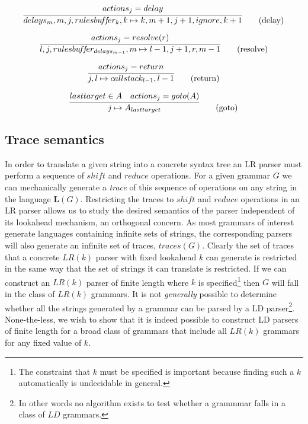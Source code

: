 \documentclass[envcountsame,runningheads]{llncs}
\begin{document}
\begin{equation}
\infer{delays_m, m, j, rulesbu\!f\!f\!er_k, k \mapsto k, m+1, j+1, ignore, k+1}{actions_j = delay} \tag{delay}
\end{equation}

\begin{equation}
\infer{l, j, rulesbu\!f\!f\!er_{delays_{m-1}}, m \mapsto l-1, j+1, r, m-1}{actions_j = resolve(r)} \tag{resolve}
\end{equation}

\begin{equation}
\infer{j, l \mapsto callstack_{l-1}, l-1}{actions_j = return} \tag{return}
\end{equation}

\begin{equation}
\infer{j \mapsto A_{lasttarget}}{lasttarget \in A & actions_j = goto(A)} \tag{goto}
\end{equation}

\subsection{Trace semantics}

In order to translate a given string into a concrete syntax tree an LR parser must perform a sequence of $shi\!ft$ and $reduce$ operations.
For a given grammar $G$ we can mechanically generate a \emph{trace} of this sequence of operations on any string in the language $\boldsymbol{L}(G)$.
Restricting the traces to $shi\!ft$ and $reduce$ operations in an LR parser allows us to study the desired semantics of the parser independent of its lookahead mechanism, an orthogonal concern.
As most grammars of interest generate languages containing infinite sets of strings, the corresponding parsers will also generate an infinite set of traces, $traces(G)$.
Clearly the set of traces that a concrete $LR(k)$ parser with fixed lookahead $k$ can generate is restricted in the same way that the set of strings it can translate is restricted.
If we can construct an $LR(k)$ parser of finite length where $k$ is specified\footnote{The constraint that $k$ must be specified is important because finding such a $k$ automatically is undecidable in general.}
then $G$ will fall in the class of $LR(k)$ grammars.
It is not \emph{generally} possible to determine whether all the strings generated by a grammar can be parsed by a LD parser\footnote{In other words no algorithm exists to test whether a grammmar falls in a class of $LD$ grammars.}.
None-the-less, we wish to show that it is indeed possible to construct LD parsers of finite length for a broad class of grammars that include all $LR(k)$ grammars for any fixed value of $k$.
\end{document}
